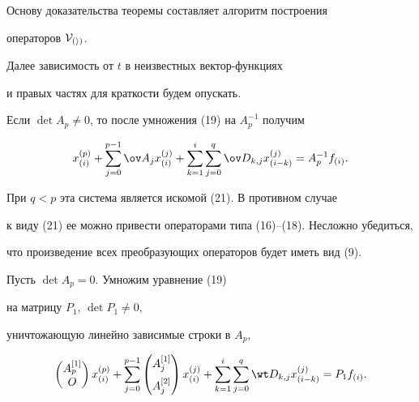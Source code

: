 \begin{pf}


Основу доказательства теоремы составляет алгоритм построения


операторов $\cal V_{(i)}$. 


Далее зависимость от $t$ в неизвестных вектор-функциях


и правых частях для краткости будем опускать.





Если $\det A_p \ne 0$, то после умножения (19) на $A_p^{-1}$ получим


$$


x_{(i)}^{(p)}+


\sum_{j=0}^{p-1}{\ov A_{j}x_{(i)}^{(j)}} +


\sum_{k=1}^{i}


{\sum_{j=0}^{q}{\ov D_{k,j}x_{(i-k)}^{(j)}}}=A_p^{-1}f_{(i)}.


$$


При $q<p$ эта система является искомой (21). В противном случае


к виду (21) ее можно привести операторами типа (16)--(18). Несложно убедиться,


что произведение всех преобразующих операторов будет иметь вид (9).





Пусть $\det A_p =0$. Умножим уравнение (19) 


на матрицу $P_1$, $\det P_1 \ne 0$,


уничтожающую линейно зависимые строки в $A_p$,


$$


\begin{pmatrix}


A_p^{[1]}\\ O


\end{pmatrix} x_{(i)}^{(p)}+\sum_{j=0}^{p-1}{


\begin{pmatrix}


 A_j^{[1]} \\[2mm] A_j^{[2]} 


\end{pmatrix}


x_{(i)}^{(j)}}+


\sum_{k=1}^{i}


{\sum_{j=0}^{q}{\wt D_{k,j}x_{(i-k)}^{(j)}}}=P_1f_{(i)}.


$$



\end{pf}
